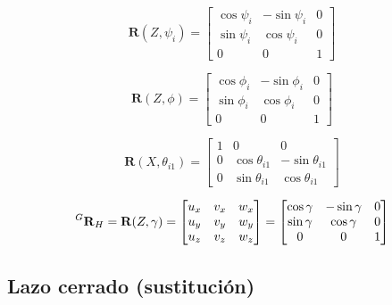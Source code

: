 \documentclass[titlepage, letterpaper, fleqn]{article}
\let\bs\mathbf
\begin{document}
\begin{equation}
    \label{eq:rot_Z_psi}
    \bs{R}(Z,\psi_i) =
    \begin{bmatrix}
        \cos\psi_i & -\sin\psi_i & 0 \\
        \sin\psi_i & \cos\psi_i & 0 \\
        0 & 0 & 1
    \end{bmatrix}
\end{equation}

\begin{equation}
    \label{eq:rot_Z_phi}
    \bs{R}(Z,\phi) =
    \begin{bmatrix}
        \cos\phi_i & -\sin\phi_i & 0 \\
        \sin\phi_i & \cos\phi_i & 0 \\
        0 & 0 & 1
    \end{bmatrix}
\end{equation}

\begin{equation}
    \label{eq:rot_X_theta}
    \bs{R}(X,\theta_{i1}) =
    \begin{bmatrix}
        1 & 0 & 0 \\
        0 & \cos\theta_{i1} & -\sin\theta_{i1} \\
        0 & \sin\theta_{i1} & \cos\theta_{i1}
    \end{bmatrix}
\end{equation}

\begin{equation}
    \label{eq:rot_H_global}
    \prescript{G}{}{\bs{R}}_H =
    \bs{R}(Z,\gamma) =
    \begin{bmatrix}
    u_x & v_x & w_x \\
    u_y & v_y & w_y \\
    u_z & v_z & w_z
    \end{bmatrix}
    =
    \begin{bmatrix}
    \cos\gamma & -\sin\gamma & 0 \\
    \sin\gamma & \cos\gamma & 0 \\
    0 & 0 & 1
    \end{bmatrix}
\end{equation}


\subsection{Lazo cerrado (sustitución)} %
\label{sec:loop_closure_sust}
\end{document}
